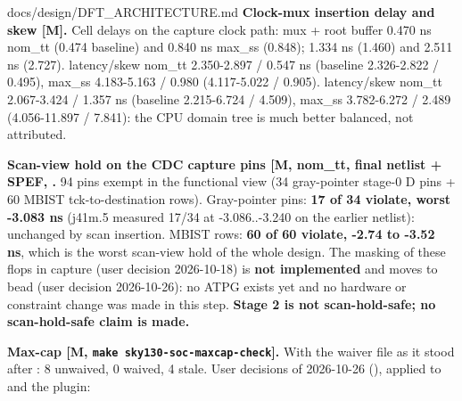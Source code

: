 \begin{relocated}{docs/design/DFT_ARCHITECTURE.md}
\textbf{Clock-mux insertion delay and skew {[}M{]}.} Cell delays on the
capture clock path:  mux + root buffer 0.470 ns
nom\_tt (0.474 baseline) and 0.840 ns max\_ss (0.848);
 1.334 ns (1.460) and 2.511 ns (2.727).
 latency/\allowbreak{}skew nom\_tt 2.350-2.897 / 0.547 ns
(baseline 2.326-2.822 / 0.495), max\_ss 4.183-5.163 / 0.980 (4.117-5.022
/ 0.905).  latency/\allowbreak{}skew nom\_tt 2.067-3.424 /
1.357 ns (baseline 2.215-6.724 / 4.509), max\_ss 3.782-6.272 / 2.489
(4.056-11.897 / 7.841): the CPU domain tree is much better balanced, not
attributed.

\textbf{Scan-view hold on the CDC capture pins {[}M, nom\_tt, final
netlist + SPEF, \code{CVT_SDC_SCAN_VIEW=1}{]}.} 94 pins exempt in the
functional view (34 gray-pointer stage-0 D pins + 60 MBIST
tck-to-destination rows). Gray-pointer pins: \textbf{17 of 34 violate,
worst -3.083 ns} (j41m.5 measured 17/34 at -3.086..-3.240 on the earlier
netlist): unchanged by scan insertion. MBIST rows: \textbf{60 of 60
violate, -2.74 to -3.52 ns}, which is the worst scan-view hold of the
whole design. The masking of these flops in capture (user decision
2026-10-18) is \textbf{not implemented} and moves to bead 
(user decision 2026-10-26): no ATPG exists yet and no hardware or
constraint change was made in this step. \textbf{Stage 2 is not
scan-hold-safe; no scan-hold-safe claim is made.}

\textbf{Max-cap {[}M,
\texttt{make\ sky130-\allowbreak{}soc-\allowbreak{}maxcap-\allowbreak{}check}{]}.}
With the waiver file as it stood after : 8 unwaived, 0 waived, 4
stale. User decisions of 2026-10-26 (), applied to
 and the plugin:


\end{relocated}
